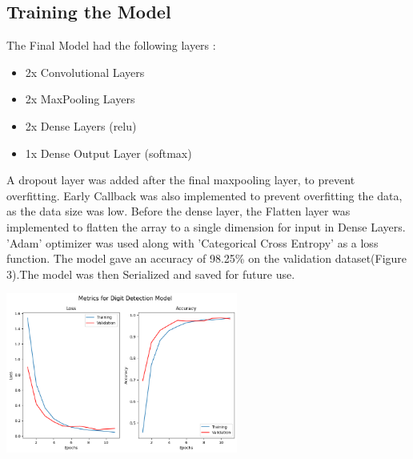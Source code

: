 \documentclass[a4paper,12pt]{article}
\begin{document}
\subsection{Training the Model}
The Final Model had the following layers : 
\begin{itemize}
    \item 2x Convolutional Layers
    \item 2x MaxPooling Layers
    \item 2x Dense Layers (relu)
    \item 1x Dense Output Layer (softmax)
\end{itemize}
A dropout layer was added after the final maxpooling layer, to prevent overfitting. Early Callback was also implemented to prevent overfitting the data, as the data size was low. Before the dense layer, the Flatten layer was implemented to flatten the array to a single dimension for input in Dense Layers\cite{mnist}. 'Adam' optimizer was used along with 'Categorical Cross Entropy' as a loss function.
The model gave an accuracy of 98.25\% on the validation dataset(Figure 3).The model was then Serialized and saved for future use.
\begin{center}
        \includegraphics[width=3in]{model.png}
        \label{fig:figure_label}
\end{center}
\end{document}
